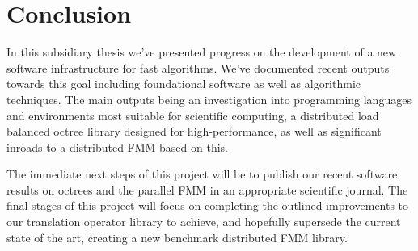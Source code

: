 \chapter{Conclusion}\label{chpt:conclusion}

In this subsidiary thesis we've presented progress on the development of a new software infrastructure for fast algorithms. We've documented recent outputs towards this goal including foundational software as well as algorithmic techniques. The main outputs being an investigation into programming languages and environments most suitable for scientific computing, a distributed load balanced octree library designed for high-performance, as well as significant inroads to a distributed FMM based on this.

The immediate next steps of this project will be to publish our recent software results on octrees and the parallel FMM in an appropriate scientific journal. The final stages of this project will focus on completing the outlined improvements to our translation operator library to achieve, and hopefully supersede the current state of the art, creating a new benchmark distributed FMM library.
